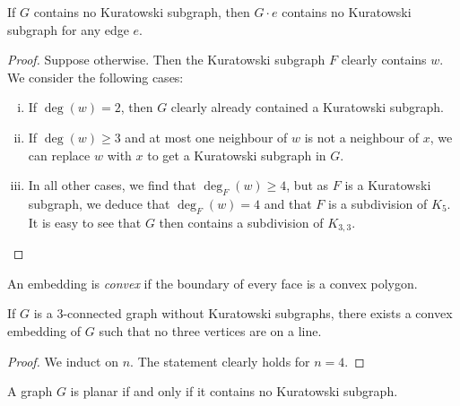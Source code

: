 \begin{lema}
If $G$ contains no Kuratowski subgraph, then $G \cdot e$ contains
no Kuratowski subgraph for any edge $e$.
\end{lema}

\begin{proof}
Suppose otherwise. Then the Kuratowski subgraph $F$ clearly
contains $w$. We consider the following cases:

\begin{enumerate}[i)]
\item If $\deg(w) = 2$, then $G$ clearly already contained a
Kuratowski subgraph.
\item If $\deg(w) \geq 3$ and at most one neighbour of $w$ is not a
neighbour of $x$, we can replace $w$ with $x$ to get a Kuratowski
subgraph in $G$.
\item In all other cases, we find that $\deg_F(w) \geq 4$, but as
$F$ is a Kuratowski subgraph, we deduce that $\deg_F(w) = 4$ and
that $F$ is a subdivision of $K_5$. It is easy to see that $G$ then
contains a subdivision of $K_{3,3}$. \qedhere
\end{enumerate}
\end{proof}

\begin{definicija}
An embedding is \emph{convex} if the
boundary of every face is a convex polygon.
\end{definicija}

\begin{izrek}
If $G$ is a $3$-connected graph without Kuratowski subgraphs, there
exists a convex embedding of $G$ such that no three vertices are
on a line.
\end{izrek}

\begin{proof}
We induct on $n$. The statement clearly holds for $n=4$.
\end{proof}

\begin{izrek}[Kuratowski]
A graph $G$ is planar if and only if it contains no Kuratowski
subgraph.
\end{izrek}
